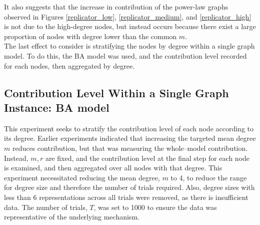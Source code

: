 It also suggests that the increase in contribution of the power-law graphs observed in Figures \ref{replicator_low}, \ref{replicator_medium}, and \ref{replicator_high} is not due to the high-degree nodes, but instead occurs because there exist a large proportion of nodes with degree lower than the common $m$.  \\

The last effect to consider is stratifying the nodes by degree within a single graph model. To do this, the BA model was used, and the contribution level recorded for each nodes, then aggregated by degree.

\subsection{Contribution Level Within a Single Graph Instance: BA model } 
This experiment seeks to stratify the contribution level of each node according to its degree. Earlier experiments indicated that increasing the targeted mean degree $m$ reduces contribution, but that was measuring the whole--model contribution. Instead, $m, r$ are fixed, and the contribution level at the final step for each node is examined, and then aggregated over all nodes with that degree. This experiment necessitated reducing the mean degree, $m$ to 4, to reduce the range for degree size and therefore the number of trials required. Also, degree sizes with less than 6 representations across all trials were removed, as there is insufficient data. The number of trials, $T$, was set to 1000 to ensure the data was representative of the underlying mechanism. \\

